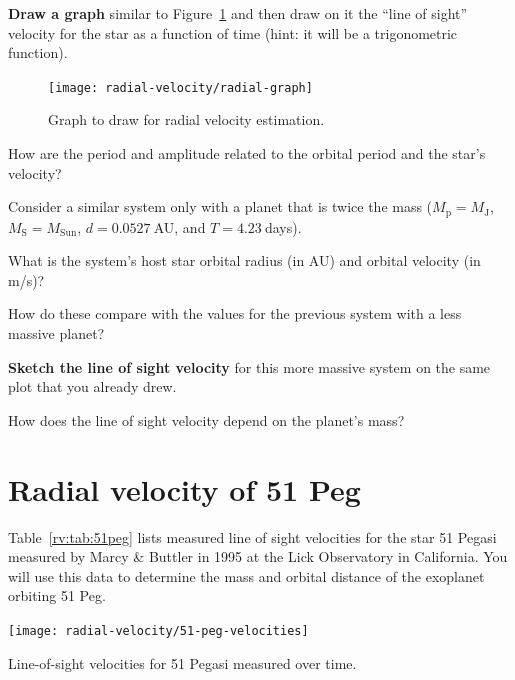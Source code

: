 \begin{steps}
	\item \textbf{Draw a graph} similar to Figure~\ref{rv:fig:graph} and then draw on it the ``line of sight'' velocity for the star as a function of time (hint: it will be a trigonometric function).
\end{steps}

\begin{figure}
	\centering
	\texttt{[image: radial-velocity/radial-graph]}
	\caption{Graph to draw for radial velocity estimation.}\label{rv:fig:graph}
\end{figure}

\begin{steps}
	\item How are the period and amplitude related to the orbital period and the star’s velocity?
\end{steps}

Consider a similar system only with a planet that is twice the mass ($M_\textrm{p} = M_\textrm{J}$, $M_\textrm{S} = M_\textrm{Sun}$, $d = 0.0527\:$AU, and $T = 4.23\:$days).

\begin{steps}
	\item What is the system's host star orbital radius (in AU) and orbital velocity (in m/s)?
	
	\item How do these compare with the values for the previous system with a less massive planet?

	\item \textbf{Sketch the line of sight velocity} for this more massive system on the same plot that you already drew.

	\item How does the line of sight velocity depend on the planet’s mass?
\end{steps}

\section{Radial velocity of 51 Peg}

Table~\ref{rv:tab:51peg} lists measured line of sight velocities for the star 51 Pegasi measured by Marcy \& Buttler in 1995 at the Lick Observatory in California. You will use this data to determine the mass and orbital distance of the exoplanet orbiting 51 Peg.

\begin{table}
	\centering
	\texttt{[image: radial-velocity/51-peg-velocities]}
	\caption{Line-of-sight velocities for 51 Pegasi measured over time.}\label{rv:tab:51peg}
\end{table}

